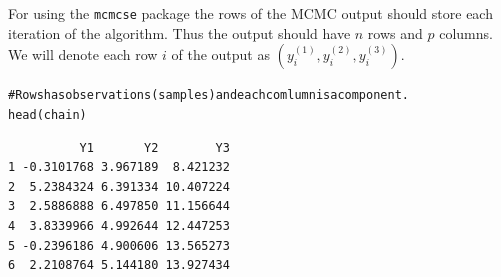 \documentclass[11pt]{article}\usepackage[]{graphicx}\usepackage[]{color}
\makeatletter
\newcommand{\hlcom}[1]{\textcolor[rgb]{0.161,0.161,0.8}{#1}}%
\newcommand{\hlstd}[1]{\textcolor[rgb]{0,0,0}{#1}}%
\newcommand{\hlkwd}[1]{\textcolor[rgb]{0,0,0.561}{#1}}%
\newenvironment{kframe}{%
 \def\at@end@of@kframe{}%
 \ifinner\ifhmode%
  \def\at@end@of@kframe{\end{minipage}}%
  \begin{minipage}{\columnwidth}%
 \fi\fi%
 \def\FrameCommand##1{\hskip\@totalleftmargin \hskip-\fboxsep
 \colorbox{shadecolor}{##1}\hskip-\fboxsep
     \hskip-\linewidth \hskip-\@totalleftmargin \hskip\columnwidth}%
 \MakeFramed {\advance\hsize-\width
   \@totalleftmargin\z@ \linewidth\hsize
   \@setminipage}}%
 {\par\unskip\endMakeFramed%
 \at@end@of@kframe}
\newenvironment{knitrout}{}{} %
\makeatother
\begin{document}
For using the \texttt{mcmcse} package the rows of the MCMC output should store each iteration of the algorithm. Thus the output should have $n$ rows and $p$ columns. We will denote each row $i$ of the output as $(y^{(1)}_i, y^{(2)}_i, y^{(3)}_i)$.

\begin{knitrout}
\color{fgcolor}\begin{kframe}
\begin{alltt}
\hlcom{#Rows has observations (samples) and each comlumn is a component. }
\hlkwd{head}\hlstd{(chain)}
\end{alltt}
\begin{verbatim}
          Y1       Y2        Y3
1 -0.3101768 3.967189  8.421232
2  5.2384324 6.391334 10.407224
3  2.5886888 6.497850 11.156644
4  3.8339966 4.992644 12.447253
5 -0.2396186 4.900606 13.565273
6  2.2108764 5.144180 13.927434
\end{verbatim}
\end{kframe}
\end{knitrout}
\end{document}
